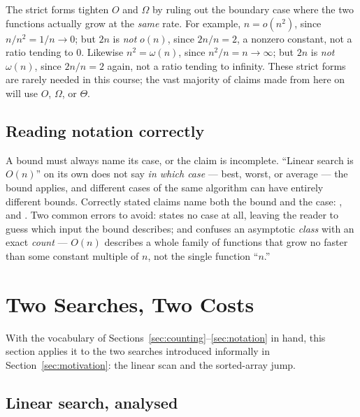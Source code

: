 \documentclass[11pt]{article}
\begin{document}
The strict forms tighten $O$ and $\Omega$ by ruling out the boundary case
where the two functions actually grow at the \emph{same} rate. For example,
$n = o(n^2)$, since $n/n^2 = 1/n \to 0$; but $2n$ is \emph{not} $o(n)$,
since $2n/n = 2$, a nonzero constant, not a ratio tending to $0$. Likewise
$n^2 = \omega(n)$, since $n^2/n = n \to \infty$; but $2n$ is \emph{not}
$\omega(n)$, since $2n/n = 2$ again, not a ratio tending to infinity. These
strict forms are rarely needed in this course; the vast majority of claims
made from here on will use $O$, $\Omega$, or $\Theta$.

\subsection{Reading notation correctly}

A bound must always name its case, or the claim is incomplete. ``Linear
search is $O(n)$'' on its own does not say \emph{in which case} --- best,
worst, or average --- the bound applies, and different cases of the same
algorithm can have entirely different bounds. Correctly stated claims name
both the bound and the case: , and . Two common
errors to avoid:  states no case at
all, leaving the reader to guess which input the bound describes; and
 confuses an asymptotic
\emph{class} with an exact \emph{count} --- $O(n)$ describes a whole family
of functions that grow no faster than some constant multiple of $n$, not the
single function ``$n$.'' 

\section{Two Searches, Two Costs}
\label{sec:searches}

With the vocabulary of Sections~\ref{sec:counting}--\ref{sec:notation} in
hand, this section applies it to the two searches introduced informally in
Section~\ref{sec:motivation}: the linear scan and the sorted-array jump.

\subsection{Linear search, analysed}
\end{document}
